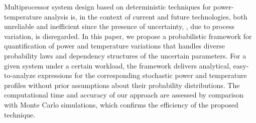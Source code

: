 Multiprocessor system design based on deterministic techniques for power-temperature analysis is, in the context of current and future technologies, both unreliable and inefficient since the presence of uncertainty, \eg, due to process variation, is disregarded. In this paper, we propose a probabilistic framework for quantification of power and temperature variations that handles diverse probability laws and dependency structures of the uncertain parameters. For a given system under a certain workload, the framework delivers analytical, easy-to-analyze expressions for the corresponding stochastic power and temperature profiles without prior assumptions about their probability distributions. The computational time and accuracy of our approach are assessed by comparison with Monte Carlo simulations, which confirms the efficiency of the proposed technique.
